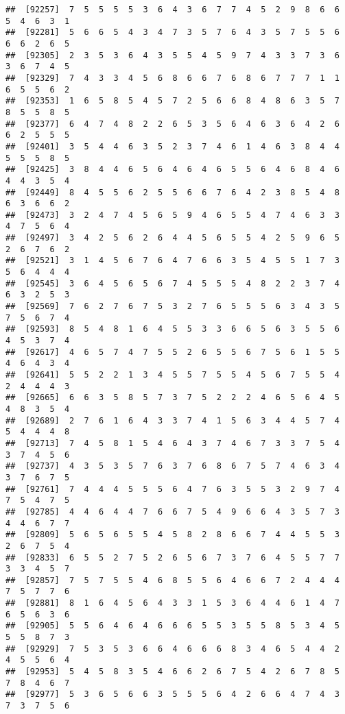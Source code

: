 \documentclass[
]{book}
\begin{document}
\begin{verbatim}
##  [92257]  7  5  5  5  5  3  6  4  3  6  7  7  4  5  2  9  8  6  6  5  4  6  3  1
##  [92281]  5  6  6  5  4  3  4  7  3  5  7  6  4  3  5  7  5  5  6  6  6  2  6  5
##  [92305]  2  3  5  3  6  4  3  5  5  4  5  9  7  4  3  3  7  3  6  3  6  7  4  5
##  [92329]  7  4  3  3  4  5  6  8  6  6  7  6  8  6  7  7  7  1  1  6  5  5  6  2
##  [92353]  1  6  5  8  5  4  5  7  2  5  6  6  8  4  8  6  3  5  7  8  5  5  8  5
##  [92377]  6  4  7  4  8  2  2  6  5  3  5  6  4  6  3  6  4  2  6  6  2  5  5  5
##  [92401]  3  5  4  4  6  3  5  2  3  7  4  6  1  4  6  3  8  4  4  5  5  5  8  5
##  [92425]  3  8  4  4  6  5  6  4  6  4  6  5  5  6  4  6  8  4  6  4  4  3  5  4
##  [92449]  8  4  5  5  6  2  5  5  6  6  7  6  4  2  3  8  5  4  8  6  3  6  6  2
##  [92473]  3  2  4  7  4  5  6  5  9  4  6  5  5  4  7  4  6  3  3  4  7  5  6  4
##  [92497]  3  4  2  5  6  2  6  4  4  5  6  5  5  4  2  5  9  6  5  2  6  7  6  2
##  [92521]  3  1  4  5  6  7  6  4  7  6  6  3  5  4  5  5  1  7  3  5  6  4  4  4
##  [92545]  3  6  4  5  6  5  6  7  4  5  5  5  4  8  2  2  3  7  4  6  3  2  5  3
##  [92569]  7  6  2  7  6  7  5  3  2  7  6  5  5  5  6  3  4  3  5  7  5  6  7  4
##  [92593]  8  5  4  8  1  6  4  5  5  3  3  6  6  5  6  3  5  5  6  4  5  3  7  4
##  [92617]  4  6  5  7  4  7  5  5  2  6  5  5  6  7  5  6  1  5  5  4  6  4  3  4
##  [92641]  5  5  2  2  1  3  4  5  5  7  5  5  4  5  6  7  5  5  4  2  4  4  4  3
##  [92665]  6  6  3  5  8  5  7  3  7  5  2  2  2  4  6  5  6  4  5  4  8  3  5  4
##  [92689]  2  7  6  1  6  4  3  3  7  4  1  5  6  3  4  4  5  7  4  5  4  4  4  8
##  [92713]  7  4  5  8  1  5  4  6  4  3  7  4  6  7  3  3  7  5  4  3  7  4  5  6
##  [92737]  4  3  5  3  5  7  6  3  7  6  8  6  7  5  7  4  6  3  4  3  7  6  7  5
##  [92761]  7  4  4  4  5  5  5  6  4  7  6  3  5  5  3  2  9  7  4  7  5  4  7  5
##  [92785]  4  4  6  4  4  7  6  6  7  5  4  9  6  6  4  3  5  7  3  4  4  6  7  7
##  [92809]  5  6  5  6  5  5  4  5  8  2  8  6  6  7  4  4  5  5  3  2  6  7  5  4
##  [92833]  6  5  5  2  7  5  2  6  5  6  7  3  7  6  4  5  5  7  7  3  3  4  5  7
##  [92857]  7  5  7  5  5  4  6  8  5  5  6  4  6  6  7  2  4  4  4  7  5  7  7  6
##  [92881]  8  1  6  4  5  6  4  3  3  1  5  3  6  4  4  6  1  4  7  6  5  6  3  6
##  [92905]  5  5  6  4  6  4  6  6  6  5  5  3  5  5  8  5  3  4  5  5  5  8  7  3
##  [92929]  7  5  3  5  3  6  6  4  6  6  6  8  3  4  6  5  4  4  2  4  5  5  6  4
##  [92953]  5  4  5  8  3  5  4  6  6  2  6  7  5  4  2  6  7  8  5  7  8  4  6  7
##  [92977]  5  3  6  5  6  6  3  5  5  5  6  4  2  6  6  4  7  4  3  7  3  7  5  6

\end{verbatim}
\end{document}
